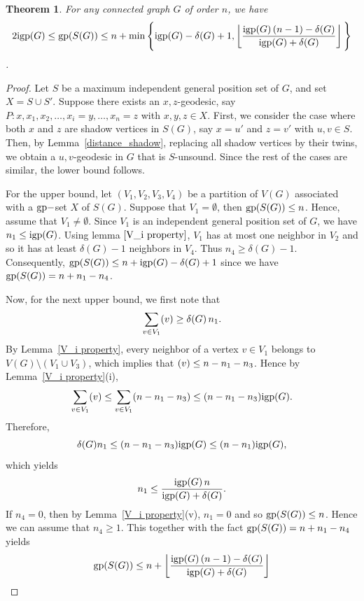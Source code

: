 \documentclass[a4paper,12pt]{article}
\newtheorem{theorem}{Theorem}[section]
\newcommand{\gp}{{\rm gp}}
\newcommand{\igp}{{\rm igp}}
\let\deg\relax
\DeclareMathOperator {\deg} {deg}
\begin{document}
{    \begin{theorem}\label{gp-shadow-bound}
    For any connected graph $G$ of order $n$, we have
    $$2\igp(G) \leq \gp(S(G)) \leq n +\min\Bigg\{ \igp(G)-\delta(G)
    +1, \left\lfloor\frac{\igp(G)\,(n-1)-\delta(G)}{\igp(G)+\delta(G)}\right\rfloor\Bigg\}$$.
\end{theorem}
\begin{proof}
Let $S$ be a maximum independent general position set of $G$, and set $X = S \cup S'$. Suppose there exists an $x,z$-geodesic, say 
$P: x, x_1, x_2, \dots, x_i=y, \dots, x_n=z$ with $x,y,z \in X$. First, we consider the case where both $x$ and $z$ are shadow vertices in $S(G)$, say $x=u'$ and $z=v'$ with $u,v \in S$. Then, by Lemma~\ref{distance_shadow}, replacing all shadow vertices by their twins, we obtain a $u,v$-geodesic in $G$ that is $S$-unsound. Since the rest of the cases are similar, the lower bound follows.

For the upper bound, let $(V_1,V_2,V_3,V_4)$ be a partition of $V(G)$ associated with a $\gp-$set $X$ of $S(G)$. Suppose that $V_1 = \emptyset$, then $\gp(S(G)) \leq n$. Hence, assume that $V_1 \not= \emptyset$. Since $V_1$ is an independent general position set of $G$, we have $n_1 \leq \igp(G)$. Using lemma $\ref{V_i property}$, $V_1$ has at most one neighbor in $V_2$ and so it has at least $\delta(G)-1$ neighbors in $V_4$. Thus $n_4 \geq \delta(G)-1$. Consequently, $\gp(S(G)) \leq n + \igp(G) - \delta(G) +1$ since we have $\gp(S(G))=n+n_1-n_4$. 

 Now, for the next upper bound, we first note that 
\[
\sum_{v \in V_1} \deg(v) \geq \delta(G)\,n_1 .
\]
By Lemma~\ref{V_i property}, every neighbor of a vertex $v \in V_1$ belongs to $V(G)\setminus (V_1 \cup V_3)$, which implies that $\deg(v) \leq n-n_1-n_3$.  Hence by Lemma~\ref{V_i property}(i), 
\[
\sum_{v \in V_1} \deg(v) \leq \sum_{v \in V_1} (n-n_1-n_3) \leq (n-n_1-n_3)\igp(G).
\]
Therefore,
\[
\delta(G)n_1 \leq (n-n_1-n_3)\igp(G)\leq (n-n_1)\igp(G) ,
\]
which yields
\[
n_1 \leq \frac{\igp(G)\,n}{\igp(G)+\delta(G)}. 
\] If $n_4=0$, then by Lemma~\ref{V_i property}(v), $n_1=0$ and so $\gp(S(G))\leq n$. Hence we can assume that $n_4\geq 1$. This together with the fact $\gp(S(G)) = n+n_1-n_4$ yields
\[\gp(S(G)) \leq n + \left\lfloor\frac{\igp(G)\,(n-1)-\delta(G)}{\igp(G)+\delta(G)}\right\rfloor\]
\end{proof}


}
\end{document}
